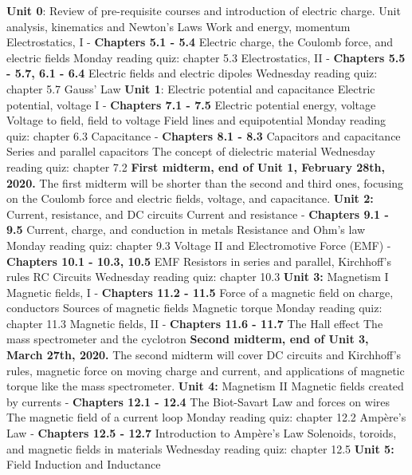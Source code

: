 \documentclass[10pt]{article}
\begin{document}
\begin{outline}[enumerate]
\1 \textbf{Unit 0}: Review of pre-requisite courses and introduction of electric charge.
\2 Unit analysis, kinematics and Newton's Laws
\2 Work and energy, momentum
\2 Electrostatics, I - \textbf{Chapters 5.1 - 5.4}
\3 Electric charge, the Coulomb force, and electric fields
\3 Monday reading quiz: chapter 5.3
\2 Electrostatics, II - \textbf{Chapters 5.5 - 5.7, 6.1 - 6.4}
\3 Electric fields and electric dipoles
\3 Wednesday reading quiz: chapter 5.7
\3 Gauss' Law
\1 \textbf{Unit 1}: Electric potential and capacitance
\2 Electric potential, voltage I - \textbf{Chapters 7.1 - 7.5}
\3 Electric potential energy, voltage
\3 Voltage to field, field to voltage
\3 Field lines and equipotential
\3 Monday reading quiz: chapter 6.3
\2 Capacitance - \textbf{Chapters 8.1 - 8.3}
\3 Capacitors and capacitance
\3 Series and parallel capacitors
\3 The concept of dielectric material
\3 Wednesday reading quiz: chapter 7.2
\1 \textbf{First midterm, end of Unit 1, February 28th, 2020.} The first midterm will be shorter than the second and third ones, focusing on the Coulomb force and electric fields, voltage, and capacitance.
\1 \textbf{Unit 2:} Current, resistance, and DC circuits
\2 Current and resistance - \textbf{Chapters 9.1 - 9.5}
\3 Current, charge, and conduction in metals
\3 Resistance and Ohm's law
\3 Monday reading quiz: chapter 9.3
\2 Voltage II and Electromotive Force (EMF) - \textbf{Chapters 10.1 - 10.3, 10.5}
\3 EMF
\3 Resistors in series and parallel, Kirchhoff's rules
\3 RC Circuits
\3 Wednesday reading quiz: chapter 10.3
\1 \textbf{Unit 3:} Magnetism I
\2 Magnetic fields, I - \textbf{Chapters 11.2 - 11.5}
\3 Force of a magnetic field on charge, conductors
\3 Sources of magnetic fields
\3 Magnetic torque
\3 Monday reading quiz: chapter 11.3
\2 Magnetic fields, II - \textbf{Chapters 11.6 - 11.7}
\3 The Hall effect
\3 The mass spectrometer and the cyclotron
\1 \textbf{Second midterm, end of Unit 3, March 27th, 2020.} The second midterm will cover DC circuits and Kirchhoff's rules, magnetic force on moving charge and current, and applications of magnetic torque like the mass spectrometer.
\1 \textbf{Unit 4:} Magnetism II
\2 Magnetic fields created by currents - \textbf{Chapters 12.1 - 12.4}
\3 The Biot-Savart Law and forces on wires
\3 The magnetic field of a current loop
\3 Monday reading quiz: chapter 12.2
\2 Amp\`{e}re's Law - \textbf{Chapters 12.5 - 12.7}
\3 Introduction to Amp\`{e}re's Law
\3 Solenoids, toroids, and magnetic fields in materials
\3 Wednesday reading quiz: chapter 12.5
\1 \textbf{Unit 5:} Field Induction and Inductance

\end{outline}
\end{document}
